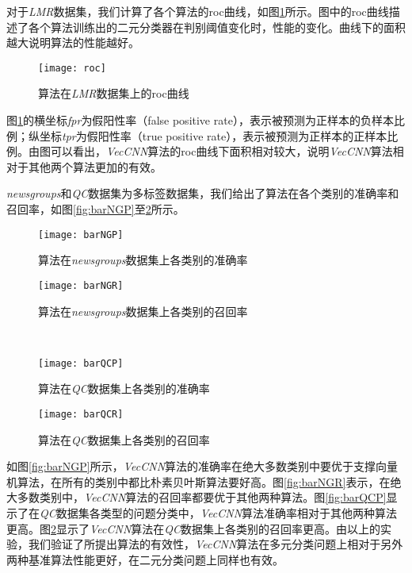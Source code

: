 对于\textit{LMR}数据集，我们计算了各个算法的roc曲线，如图\ref{fig:roc}所示。图中的roc曲线描述了各个算法训练出的二元分类器在判别阈值变化时，性能的变化。曲线下的面积越大说明算法的性能越好。

\begin{figure}[!htbp]
  \centering
  \texttt{[image: roc]}
  \caption{算法在\textit{LMR}数据集上的roc曲线}
  \label{fig:roc}
\end{figure}

图\ref{fig:roc}的横坐标\textit{fpr}为假阳性率（false positive rate），表示被预测为正样本的负样本比例；纵坐标\textit{tpr}为假阳性率（true positive rate），表示被预测为正样本的正样本比例。由图可以看出，\textit{VecCNN}算法的roc曲线下面积相对较大，说明\textit{VecCNN}算法相对于其他两个算法更加的有效。

\textit{newsgroups}和\textit{QC}数据集为多标签数据集，我们给出了算法在各个类别的准确率和召回率，如图\ref{fig:barNGP}至\ref{fig:barQCR}所示。

\begin{figure}[!htbp]
   \begin{minipage}{0.48\textwidth}
     \centering
     \texttt{[image: barNGP]}
     \caption{算法在\textit{newsgroups}数据集上各类别的准确率}
     \label{fig:barNGP}
   \end{minipage}
   \hfill
   \begin{minipage}{0.48\textwidth}
     \centering
     \texttt{[image: barNGR]}
     \caption{算法在\textit{newsgroups}数据集上各类别的召回率}
     \label{fig:barNGR}
   \end{minipage}
   \\ 
   \begin {minipage}{0.48\textwidth}
     \centering
     \texttt{[image: barQCP]}
     \caption{算法在\textit{QC}数据集上各类别的准确率}
     \label{fig:barQCP}
   \end{minipage}
   \hfill
   \begin {minipage}{0.48\textwidth}
     \centering
     \texttt{[image: barQCR]}
     \caption{算法在\textit{QC}数据集上各类别的召回率}
     \label{fig:barQCR}
   \end{minipage}
\end{figure}

如图\ref{fig:barNGP}所示，\textit{VecCNN}算法的准确率在绝大多数类别中要优于支撑向量机算法，在所有的类别中都比朴素贝叶斯算法要好高。图\ref{fig:barNGR}表示，在绝大多数类别中，\textit{VecCNN}算法的召回率都要优于其他两种算法。图\ref{fig:barQCP}显示了在\textit{QC}数据集各类型的问题分类中，\textit{VecCNN}算法准确率相对于其他两种算法更高。图\ref{fig:barQCR}显示了\textit{VecCNN}算法在\textit{QC}数据集上各类别的召回率更高。由以上的实验，我们验证了所提出算法的有效性，\textit{VecCNN}算法在多元分类问题上相对于另外两种基准算法性能更好，在二元分类问题上同样也有效。


